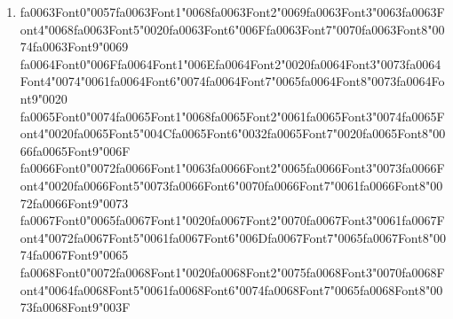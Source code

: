 \documentclass[12pt]{article}
\begin{document}
\begin{enumerate}[label=Q\arabic*.]
 \begin{enumerate}[label=(\Alph*)]
     \item The RNN uses different weights at each step
     \item The RNN ignores its previous hidden state
     \item The RNN does not produce outputs at intermediate steps
     \item The loss depends on the hidden state from time $t-1$ and the same weight matrices are reused across all time steps
 \end{enumerate}
 
 \item {\csname fa0063Font0\endcsname\char"0057}{\csname fa0063Font1\endcsname\char"0068}{\csname fa0063Font2\endcsname\char"0069}{\csname fa0063Font3\endcsname\char"0063}{\csname fa0063Font4\endcsname\char"0068}{\csname fa0063Font5\endcsname\char"0020}{\csname fa0063Font6\endcsname\char"006F}{\csname fa0063Font7\endcsname\char"0070}{\csname fa0063Font8\endcsname\char"0074}{\csname fa0063Font9\endcsname\char"0069} {\csname fa0064Font0\endcsname\char"006F}{\csname fa0064Font1\endcsname\char"006E}{\csname fa0064Font2\endcsname\char"0020}{\csname fa0064Font3\endcsname\char"0073}{\csname fa0064Font4\endcsname\char"0074}{\char"0061}{\csname fa0064Font6\endcsname\char"0074}{\csname fa0064Font7\endcsname\char"0065}{\csname fa0064Font8\endcsname\char"0073}{\csname fa0064Font9\endcsname\char"0020} {\csname fa0065Font0\endcsname\char"0074}{\csname fa0065Font1\endcsname\char"0068}{\csname fa0065Font2\endcsname\char"0061}{\csname fa0065Font3\endcsname\char"0074}{\csname fa0065Font4\endcsname\char"0020}{\csname fa0065Font5\endcsname\char"004C}{\csname fa0065Font6\endcsname\char"0032}{\csname fa0065Font7\endcsname\char"0020}{\csname fa0065Font8\endcsname\char"0066}{\csname fa0065Font9\endcsname\char"006F} {\csname fa0066Font0\endcsname\char"0072}{\csname fa0066Font1\endcsname\char"0063}{\csname fa0066Font2\endcsname\char"0065}{\csname fa0066Font3\endcsname\char"0073}{\csname fa0066Font4\endcsname\char"0020}{\csname fa0066Font5\endcsname\char"0073}{\csname fa0066Font6\endcsname\char"0070}{\csname fa0066Font7\endcsname\char"0061}{\csname fa0066Font8\endcsname\char"0072}{\csname fa0066Font9\endcsname\char"0073} {\csname fa0067Font0\endcsname\char"0065}{\csname fa0067Font1\endcsname\char"0020}{\csname fa0067Font2\endcsname\char"0070}{\csname fa0067Font3\endcsname\char"0061}{\csname fa0067Font4\endcsname\char"0072}{\csname fa0067Font5\endcsname\char"0061}{\csname fa0067Font6\endcsname\char"006D}{\csname fa0067Font7\endcsname\char"0065}{\csname fa0067Font8\endcsname\char"0074}{\csname fa0067Font9\endcsname\char"0065} {\csname fa0068Font0\endcsname\char"0072}{\csname fa0068Font1\endcsname\char"0020}{\csname fa0068Font2\endcsname\char"0075}{\csname fa0068Font3\endcsname\char"0070}{\csname fa0068Font4\endcsname\char"0064}{\csname fa0068Font5\endcsname\char"0061}{\csname fa0068Font6\endcsname\char"0074}{\csname fa0068Font7\endcsname\char"0065}{\csname fa0068Font8\endcsname\char"0073}{\csname fa0068Font9\endcsname\char"003F}

\end{enumerate}
\end{document}

